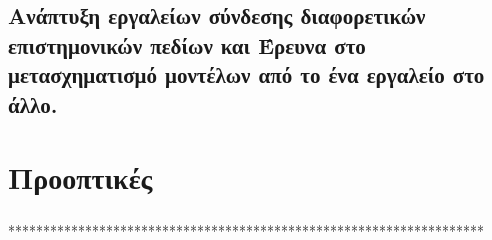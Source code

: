 \documentclass[a4paper,12pt,twoside]{report}
\begin{document}
		\section{Ανάπτυξη εργαλείων σύνδεσης διαφορετικών επιστημονικών πεδίων και Έρευνα στο μετασχηματισμό μοντέλων από το ένα εργαλείο στο άλλο.}

	\chapter{Προοπτικές}
		\label{κεφ.:Προοπτικές}
		
		\paragraph{} {********************************************************************
		}
		
\end{document}
